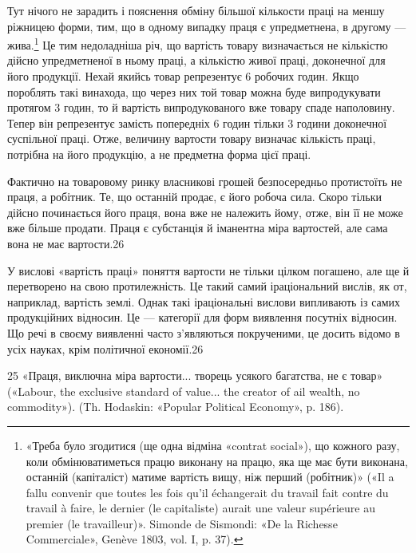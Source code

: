 Тут нічого не зарадить і пояснення обміну більшої кількости
праці на меншу ріжницею форми, тим, що в одному випадку праця
є упредметнена, в другому — жива.\footnote{
«Треба було згодитися (ще одна відміна «contrat social»), що кожного
разу, коли обмінюватиметься працю виконану на працю, яка ще
має бути виконана, останній (капіталіст) матиме вартість вищу, ніж перший
(робітник)» («Il a fallu convenir que toutes les fois qu’il échangerait du
travail fait contre du travail à faire, le dernier (le capitaliste) aurait une valeur
supérieure au premier (le travailleur)». Simonde de Sismondi: «De
la Richesse Commerciale», Genève 1803, vol. I, p. 37).
} Це тим недоладніша річ,
що вартість товару визначається не кількістю дійсно упредметненої
в ньому праці, а кількістю живої праці, доконечної для
його продукції. Нехай якийсь товар репрезентує 6 робочих годин.
Якщо пороблять такі винахода, що через них той товар можна
буде випродукувати протягом 3 годин, то й вартість випродукованого
вже товару спаде наполовину. Тепер він репрезентує
замість попередніх 6 годин тільки 3 години доконечної суспільної
праці. Отже, величину вартости товару визначає кількість праці,
потрібна на його продукцію, а не предметна форма цієї праці.

Фактично на товаровому ринку власникові грошей безпосередньо
протистоїть не праця, а робітник. Те, що останній продає,
є його робоча сила. Скоро тільки дійсно починається його
праця, вона вже не належить йому, отже, він її не може вже
більше продати. Праця є субстанція й іманентна міра вартостей,
але сама вона не має вартости.26

У вислові «вартість праці» поняття вартости не тільки цілком
погашено, але ще й перетворено на свою протилежність. Це такий
самий іраціональний вислів, як от, наприклад, вартість землі.
Однак такі іраціональні вислови випливають із самих продукційних
відносин. Це — категорії для форм виявлення посутніх
відносин. Що речі в своєму виявленні часто з’являються
покрученими, це досить відомо в усіх науках, крім політичної
економії.26

25 «Праця, виключна міра вартости... творець усякого багатства,
не є товар» («Labour, the exclusive standard of value... the creator of
ail wealth, no commodity»). (Th. Hodaskin: «Popular Political Economy»,
p. 186).

